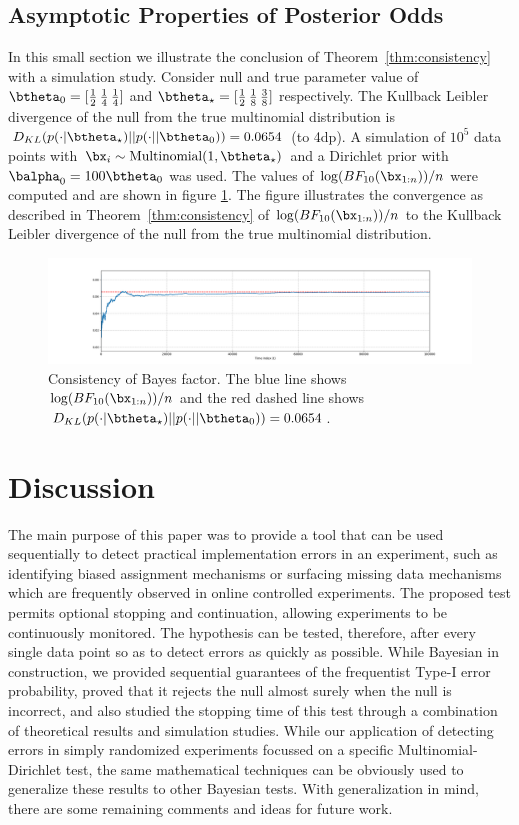 \documentclass[11pt]{article}
\def\log{{\rm log}}
\begin{document}
\subsection{Asymptotic Properties of Posterior Odds}
In this small section we illustrate the conclusion of Theorem~\ref{thm:consistency} with a simulation study.
Consider null and true parameter value of $\btheta_0=[\frac{1}{2}\, \frac{1}{4}\, \frac{1}{4}]$ and $\btheta_\star=[\frac{1}{2}\, \frac{1}{8}\, \frac{3}{8}]$ respectively.
The Kullback Leibler divergence of the null from the true multinomial distribution is $D_{KL}(p(\cdot|\btheta_\star)||p(\cdot||\btheta_0)) = 0.0654$ (to 4dp).
A simulation of $10^5$ data points with $\bx_i \sim \text{Multinomial}(1, \btheta_\star)$ and a Dirichlet prior with $\balpha_0 = 100\btheta_0$ was used.
The values of $\log(BF_{10}(\bx_{1:n}))/n$ were computed and are shown in figure \ref{fig:lbf}.
The figure illustrates the convergence as described in Theorem~\ref{thm:consistency} of $\log(BF_{10}(\bx_{1:n}))/n$ to the Kullback Leibler divergence of the null from the true multinomial distribution.
\begin{figure}[H]
  \centering
  \includegraphics[scale=0.35]{images/consistency.png}
  \caption{Consistency of Bayes factor.
The blue line shows $\log(BF_{10}(\bx_{1:n}))/n$ and the red dashed line shows $D_{KL}(p(\cdot|\btheta_\star)||p(\cdot||\btheta_0)) = 0.0654$.}
    \label{fig:lbf}
  \end{figure}
  \section{Discussion}
  \label{sec:discussion}
The main purpose of this paper was to provide a tool that can be used sequentially to detect practical implementation errors in an experiment, such as identifying biased assignment mechanisms or surfacing missing data mechanisms which are frequently observed in online controlled experiments.
The proposed test permits optional stopping and continuation, allowing experiments to be continuously monitored.
The hypothesis can be tested, therefore, after every single data point so as to detect errors as quickly as possible.
While Bayesian in construction, we provided sequential guarantees of the frequentist Type-I error probability, proved that it rejects the null almost surely when the null is incorrect, and also studied the stopping time of this test through a combination of theoretical results and simulation studies.
While our application of detecting errors in simply randomized experiments focussed on a specific Multinomial-Dirichlet test, the same mathematical techniques can be obviously used to generalize these results to other Bayesian tests.
With generalization in mind, there are some remaining comments and ideas for future work.
\end{document}
